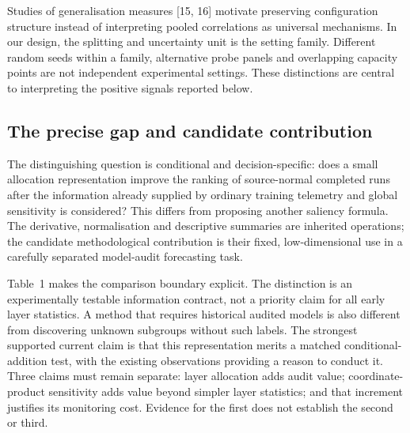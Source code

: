 Studies of generalisation measures [15, 16] motivate preserving configuration structure instead of interpreting pooled correlations as universal mechanisms. In our design, the splitting and uncertainty unit is the setting family. Different random seeds within a family, alternative probe panels and overlapping capacity points are not independent experimental settings. These distinctions are central to interpreting the positive signals reported below.


\subsection{The precise gap and candidate contribution}
The distinguishing question is conditional and decision-specific: does a small allocation representation improve the ranking of source-normal completed runs after the information already supplied by ordinary training telemetry and global sensitivity is considered? This differs from proposing another saliency formula. The derivative, normalisation and descriptive summaries are inherited operations; the candidate methodological contribution is their fixed, low-dimensional use in a carefully separated model-audit forecasting task.

Table~1 makes the comparison boundary explicit. The distinction is an experimentally testable information contract, not a priority claim for all early layer statistics. A method that requires historical audited models is also different from discovering unknown subgroups without such labels. The strongest supported current claim is that this representation merits a matched conditional-addition test, with the existing observations providing a reason to conduct it. Three claims must remain separate: layer allocation adds audit value; coordinate-product sensitivity adds value beyond simpler layer statistics; and that increment justifies its monitoring cost. Evidence for the first does not establish the second or third.

